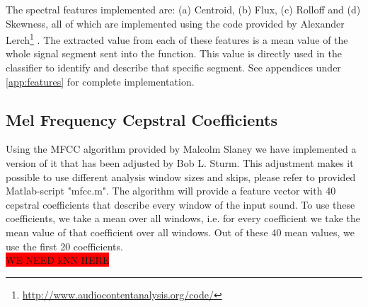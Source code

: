 The spectral features implemented are: (a) Centroid, (b) Flux, (c) Rolloff and (d) Skewness, all of which are implemented using the code provided by Alexander Lerch\footnote{\url{http://www.audiocontentanalysis.org/code/}} \citep{ACA}. The extracted value from each of these features is a mean value of the whole signal segment sent into the function. This value is directly used in the classifier to identify and describe that specific segment. See appendices under \ref{app:features} for complete implementation.

\subsection{Mel Frequency Cepstral Coefficients}
Using the MFCC algorithm provided by Malcolm Slaney we have implemented a version of it that has been adjusted by Bob L. Sturm. This adjustment makes it possible to use different analysis window sizes and skips, please refer to provided Matlab-script "mfcc.m". The algorithm will provide a feature vector with 40 cepstral coefficients that describe every window of the input sound. To use these coefficients, we take a mean over all windows, i.e. for every coefficient we take the mean value of that coefficient over all windows. Out of these 40 mean values, we use the first 20 coefficients.
\\

\colorbox{red}{WE NEED kNN HERE}